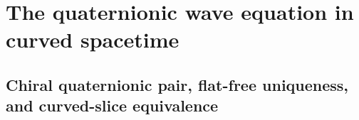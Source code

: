 \documentclass[aps,prd,onecolumn,tightenlines,nofootinbib,notitlepage,10pt,floatfix]{revtex4-2}
\theoremstyle{indentedtheorem}
\begin{document}
\section{The quaternionic wave equation in curved spacetime}
\label{sec:wave_equation}

\subsection{Chiral quaternionic pair, flat-free uniqueness, and curved-slice equivalence}
\label{sec:weyl_pair_derivation}
\end{document}
